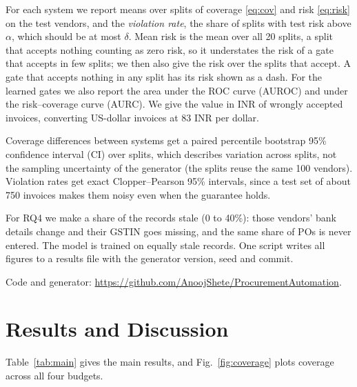\documentclass[conference]{IEEEtran}
\newif\ifanon
\newcommand{\todo}[1]{\textbf{\textcolor{red}{[TODO: #1]}}}
\begin{document}
For each system we report means over splits of coverage \eqref{eq:cov} and risk
\eqref{eq:risk} on the test vendors, and the \emph{violation rate}, the share of
splits with test risk above $\alpha$, which should be at most $\delta$. Mean risk
is the mean over all 20 splits, a split that accepts nothing counting as zero risk, so it
understates the risk of a gate that accepts in few splits; we then also give
the risk over the splits that accept. A gate that accepts nothing in any split has its risk
shown as a dash. For the learned gates we also report the area under the ROC curve (AUROC) and under the risk--coverage
curve (AURC). We give the value in INR of wrongly accepted invoices, converting
US-dollar invoices at 83 INR per dollar.

Coverage differences between systems get a paired percentile bootstrap 95\%
confidence interval (CI) over splits, which describes variation across splits, not the sampling
uncertainty of the generator (the splits reuse the same 100 vendors). Violation rates
get exact Clopper--Pearson 95\% intervals, since a test set of about 750 invoices makes them
noisy even when the guarantee holds.

For RQ4 we make a share of the records stale (0 to 40\%): those vendors' bank
details change and their GSTIN goes missing, and the same share of POs is never
entered. The model is trained on equally stale records. One script writes all figures to a results file with the
generator version, seed and commit.
\ifanon
Code and generator: \todo{T16}.
\else
Code and generator: \url{https://github.com/AnoojShete/ProcurementAutomation}.
\fi

\section{Results and Discussion}\label{sec:results}
Table~\ref{tab:main} gives the main results, and Fig.~\ref{fig:coverage} plots
coverage across all four budgets.
\end{document}
